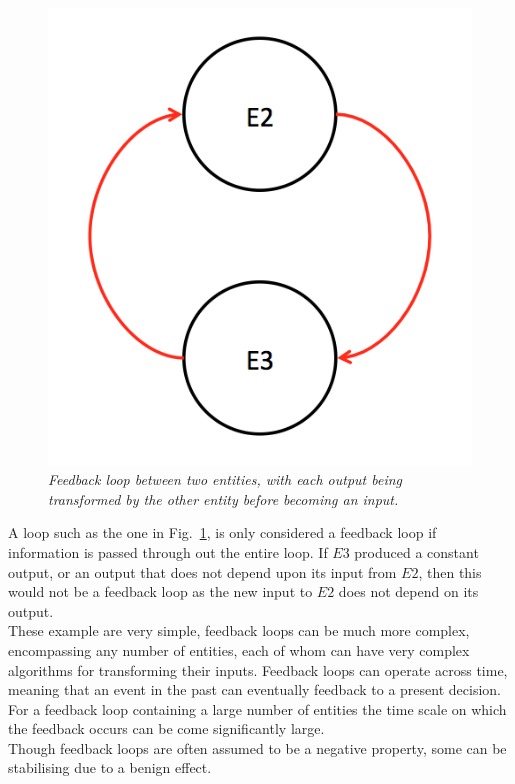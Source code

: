 \documentclass{article}
\begin{document}
\begin{figure}[H]
	\centering
	\includegraphics[scale=0.5]{twofeedback}
	\caption{\it Feedback loop between two entities, with each output being transformed by the other entity before becoming an input.}
	\label{fig:exampletwofeedback}
\end{figure} 
A loop such as the one in Fig.~\ref{fig:exampletwofeedback}, is only considered a feedback loop if information is passed through out the entire loop. If $E3$ produced a constant output, or an output that does not depend upon its input from $E2$, then this would not be a feedback loop as the new input to $E2$ does not depend on its output.\\
These example are very simple, feedback loops can be much more complex, encompassing any number of entities, each of whom can have very complex algorithms for transforming their inputs. Feedback loops can operate across time, meaning that an event in the past can eventually feedback to a present decision. For a feedback loop containing a large number of entities the time scale on which the feedback occurs can be come significantly large.\\
Though feedback loops are often assumed to be a negative property, some can be stabilising due to a benign effect.\\
\end{document}
